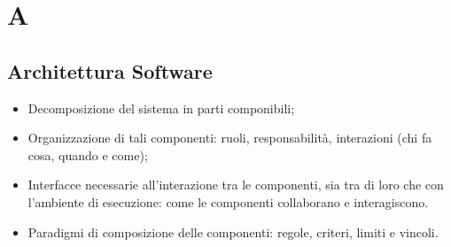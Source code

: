 \section{A}

    \subsection{Architettura Software}
    \label{glossario:architettura_software}
    \begin{itemize}
        \item Decomposizione del sistema in parti componibili;
        \item Organizzazione di tali componenti: ruoli, responsabilità, interazioni (chi fa cosa, quando e come);
        \item Interfacce necessarie all'interazione tra le componenti, sia tra di loro che con l'ambiente di esecuzione: come le componenti collaborano e interagiscono.
        \item Paradigmi di composizione delle componenti: regole, criteri, limiti e vincoli.
    \end{itemize}

\pagebreak